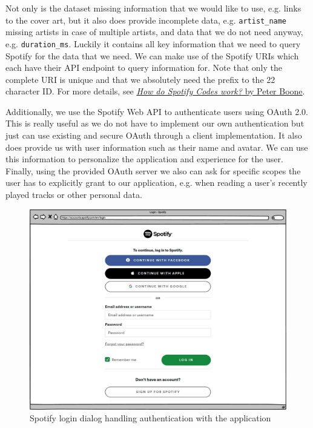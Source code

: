 Not only is the dataset missing information that we would like to use, e.g. links to the cover art, but it also does provide incomplete data, e.g. \texttt{artist\_name} missing artists in case of multiple artists, and data that we do not need anyway, e.g. \texttt{duration\_ms}. Luckily it contains all key information that we need to query Spotify for the data that we need. We can make use of the Spotify URIs which each have their API endpoint to query information for. Note that only the complete URI is unique and that we absolutely need the prefix to the 22 character ID. For more details, see \href{https://boonepeter.github.io/posts/2020-11-10-spotify-codes/}{\textit{How do Spotify Codes work?} by Peter Boone}.

Additionally, we use the Spotify Web API to authenticate users using OAuth 2.0. This is really useful as we do not have to implement our own authentication but just can use existing and secure OAuth through a client implementation. It also does provide us with user information such as their name and avatar. We can use this information to personalize the application and experience for the user. Finally, using the provided OAuth server we also can ask for specific scopes the user has to explicitly grant to our application, e.g. when reading a user's recently played tracks or other personal data.

\begin{figure}[bth]
    \centering
    \includegraphics[width=1.0\textwidth]{Graphics/Chapter2/spotify-login.pdf}
    \caption{Spotify login dialog handling authentication with the application}
\end{figure}

